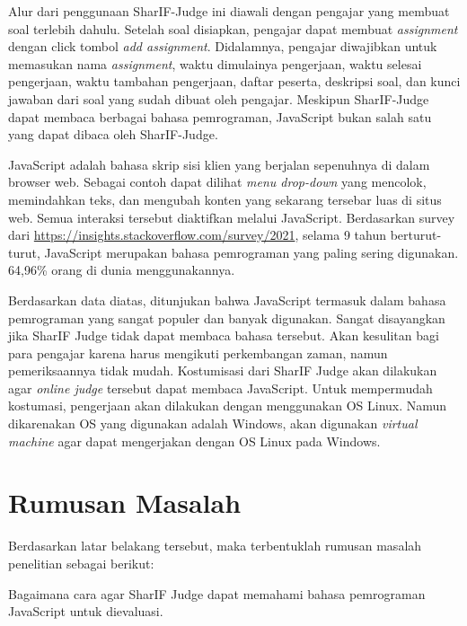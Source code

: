 \documentclass[a4paper,twoside]{article}
\begin{document}
Alur dari penggunaan SharIF-Judge ini diawali dengan pengajar yang membuat soal terlebih dahulu. Setelah soal disiapkan, pengajar dapat membuat \textit{assignment} dengan click tombol \textit{add assignment}. Didalamnya, pengajar diwajibkan untuk memasukan nama \textit{assignment}, waktu dimulainya pengerjaan, waktu selesai pengerjaan, waktu tambahan pengerjaan, daftar peserta, deskripsi soal, dan kunci jawaban dari soal yang sudah dibuat oleh pengajar. Meskipun SharIF-Judge dapat membaca berbagai bahasa pemrograman, JavaScript bukan salah satu yang dapat dibaca oleh SharIF-Judge.

JavaScript adalah bahasa skrip sisi klien yang berjalan sepenuhnya di dalam browser web. Sebagai contoh dapat dilihat \textit{menu drop-down} yang mencolok, memindahkan teks, dan mengubah konten yang sekarang tersebar luas di situs web. Semua interaksi tersebut diaktifkan melalui JavaScript. Berdasarkan survey dari \url{https://insights.stackoverflow.com/survey/2021}, selama 9 tahun berturut-turut, JavaScript merupakan bahasa pemrograman yang paling sering digunakan. 64,96\% orang di dunia menggunakannya.

Berdasarkan data diatas, ditunjukan bahwa JavaScript termasuk dalam bahasa pemrograman yang sangat populer dan banyak digunakan. Sangat disayangkan jika SharIF Judge tidak dapat membaca bahasa tersebut. Akan kesulitan bagi para pengajar karena harus mengikuti perkembangan zaman, namun pemeriksaannya tidak mudah. Kostumisasi dari SharIF Judge akan dilakukan agar \textit{online judge} tersebut dapat membaca JavaScript. Untuk mempermudah kostumasi, pengerjaan akan dilakukan dengan menggunakan OS Linux. Namun dikarenakan OS yang digunakan adalah Windows, akan digunakan \textit{virtual machine} agar dapat mengerjakan dengan OS Linux pada Windows. 


\section{Rumusan Masalah}
\label{sec:rumusan}
Berdasarkan latar belakang tersebut, maka terbentuklah rumusan masalah penelitian sebagai berikut: 

     Bagaimana cara agar SharIF Judge dapat memahami bahasa pemrograman JavaScript untuk dievaluasi.
\end{document}
